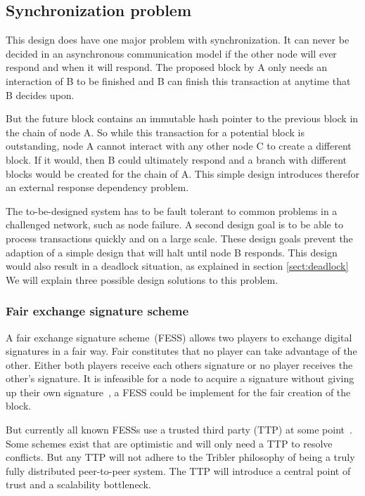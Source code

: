 \subsection{Synchronization problem}
This design does have one major problem with synchronization.
It can never be decided in an asynchronous communication model
if the other node will ever respond and when it will respond.
The proposed block by A only needs an interaction of B to be finished
and B can finish this transaction at anytime that B decides upon.

But the future block contains an immutable hash pointer
to the previous block in the chain of node A.
So while this transaction for a potential block is outstanding,
node A cannot interact with any other node C to create a different block.
If it would, then B could ultimately respond and a branch with different blocks
would be created for the chain of A.
This simple design introduces therefor an external response dependency problem.

The to-be-designed system has to be fault tolerant to
common problems in a challenged network, such as node failure.
A second design goal is to be able to process transactions quickly and on a large scale.
These design goals prevent the adaption of a simple design that will halt until node B responds.
This design would also result in a deadlock situation, as explained in section \ref{sect:deadlock}
We will explain three possible design solutions to this problem.

\subsubsection{Fair exchange signature scheme}
A fair exchange signature scheme~(FESS) allows two players to exchange digital signatures in a fair way.
Fair constitutes that no player can take advantage of the other.
Either both players receive each others signature or no player receives the other's signature.
It is infeasible for a node to acquire a signature without giving up their own signature~\cite{asokan-fairexchange},
a FESS could be implement for the fair creation of the block.

But currently all known FESSs use a trusted third party (TTP) at some point~\cite{asokan-fairexchange}.
Some schemes exist that are optimistic and will only need a TTP to resolve conflicts.
But any TTP will not adhere to the Tribler philosophy
of being a truly fully distributed peer-to-peer system.
The TTP will introduce a central point of trust and a scalability bottleneck.

